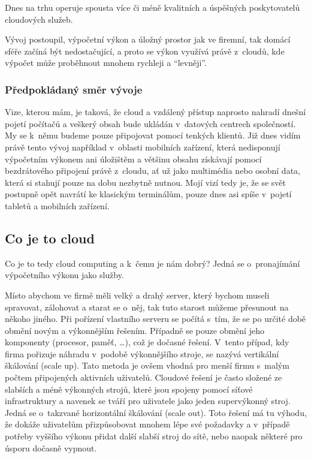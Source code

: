 Dnes na trhu operuje spousta více či méně kvalitních a úspěšných poskytovatelů cloudových služeb.

Vývoj postoupil, výpočetní výkon a úložný prostor jak ve firemní, tak domácí sféře začíná být nedostačující, a proto se výkon využívá právě z~cloudů, kde výpočet může proběhnout mnohem rychleji a "`levněji"'.

\subsubsection{Předpokládaný směr vývoje}
Vize, kterou mám, je taková, že cloud a vzdálený přístup naprosto nahradí dnešní pojetí počítačů a veškerý obsah bude ukládán v~datových centrech společností. My se k~němu budeme pouze připojovat pomocí tenkých klientů. Již dnes vidím právě tento vývoj například v~oblasti mobilních zařízení, která nedisponují výpočetním výkonem ani úložištěm a většinu obsahu získávají pomocí bezdrátového připojení právě z~cloudu, ať už jako multimédia nebo osobní data, která si stahují pouze na dobu nezbytně nutnou. Mojí vizí tedy je, že se svět postupně opět navrátí ke klasickým terminálům, pouze dnes asi spíše v~pojetí tabletů a mobilních zařízení.

\subsection{Co je to cloud}
Co je to tedy cloud computing a k~čemu je nám dobrý? Jedná se o~pronajímání výpočetního výkonu jako služby.

Místo abychom ve firmě měli velký a drahý server, který bychom museli spravovat, zálohovat a starat se o~něj, tak tuto starost můžeme přesunout na někoho jiného. Při pořízení vlastního serveru se počítá s~tím, že se po určité době obmění novým a výkonnějším řešením. Případně se pouze obmění jeho komponenty (procesor, paměť, \ldots), což je dočasné řešení. V~tento případ, kdy firma pořizuje náhradu v~podobě výkonnějšího stroje, se nazývá vertikální škálování (scale up). Tato metoda je ovšem vhodná pro menší firmu s~malým počtem připojených aktivních uživatelů. Cloudové řešení je často složené ze slabších a méně výkonných strojů, které jsou spojeny pomocí síťové infrastruktury a navenek se tváří pro uživatele jako jeden supervýkonný stroj. Jedná se o~takzvané horizontální škálování (scale out). Toto řešení má tu výhodu, že dokáže uživatelům přizpůsobovat mnohem lépe své požadavky a v~případě potřeby vyššího výkonu přidat další slabší stroj do sítě, nebo naopak některé pro úsporu dočasně vypnout.\cite{wiki:Skalovatelnost}\nocite{cpress:cloudComputing}

